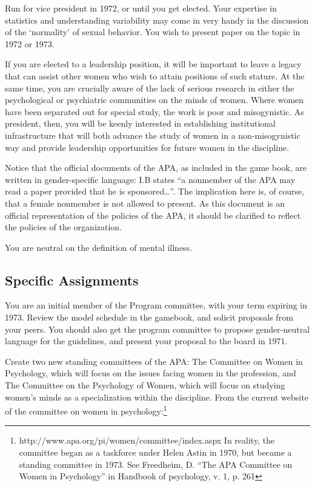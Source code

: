 Run for vice president in 1972, or until you get elected. Your expertise in statistics and understanding variability may come in very handy in the discussion of the `normality' of sexual behavior. You wish to present paper on the topic in 1972 or 1973.

If you are elected to a leadership position, it will be important to leave a legacy that can assist other women who wish to attain positions of such stature. At the same time, you are crucially aware of the lack of serious research in either the psychological or psychiatric communities on the minds of women. Where women have been separated out for special study, the work is poor and misogynistic. As president, then, you will be keenly interested in establishing institutional infrastructure that will both advance the study of women in a non-misogynistic way and provide leadership opportunities for future women in the discipline.

Notice that the official documents of the APA, as included in the game book, are written in gender-specific language: I.B states “a nonmember of the APA may read a paper provided that he is sponsored{\ldots}”. The implication here is, of course, that a female nonmember is not allowed to present. As this document is an official representation of the policies of the APA, it should be clarified to reflect the policies of the organization.

You are neutral on the definition of mental illness. 

\subsection{Specific Assignments}
\label{specificassignments}

You are an initial member of the Program committee, with your term expiring in 1973. Review the model schedule in the gamebook, and solicit proposals from your peers. You should also get the program committee to propose gender-neutral language for the guidelines, and present your proposal to the board in 1971. 

Create two new standing committees of the APA: The Committee on Women in Psychology, which will focus on the issues facing women in the profession, and The Committee on the Psychology of Women, which will focus on studying women's minds as a specialization within the discipline. From the current website of the committee on women in psychology:\footnote{http:\slash \slash www.apa.org\slash pi\slash women\slash committee\slash index.aspx In reality, the committee began as a taskforce under Helen Astin in 1970, but became a standing committee in 1973. See Freedheim, D. “The APA Committee on Women in Psychology” in Handbook of psychology, v. 1, p. 261}

